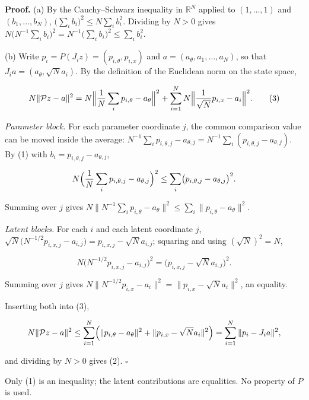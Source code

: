 \documentclass[11pt,a4paper]{report}
\begin{document}
\textbf{Proof.} (a) By the Cauchy–Schwarz inequality in \(\mathbb R^N\) applied to \((1,\dots,1)\) and \((b_1,\dots,b_N)\), \(\bigl(\sum_ib_i\bigr)^2\le N\sum_ib_i^2\). Dividing by \(N>0\) gives \(N\bigl(N^{-1}\sum_ib_i\bigr)^2=N^{-1}\bigl(\sum_ib_i\bigr)^2\le\sum_ib_i^2\).




(b) Write \(p_i=P(J_iz)=(p_{i,\theta},p_{i,x})\) and \(a=(a_\theta,a_1,\dots,a_N)\), so that \(J_ia=(a_\theta,\sqrt Na_i)\). By the definition of the Euclidean norm on the state space,


\[N\|\mathcal Pz-a\|^2=N\Bigl\|\frac1N\sum_ip_{i,\theta}-a_\theta\Bigr\|^2+\sum_{i=1}^NN\Bigl\|\frac{1}{\sqrt N}p_{i,x}-a_i\Bigr\|^2.\qquad(3)\]


\emph{Parameter block.} For each parameter coordinate \(j\), the common comparison value can be moved inside the average: \(N^{-1}\sum_ip_{i,\theta,j}-a_{\theta,j}=N^{-1}\sum_i(p_{i,\theta,j}-a_{\theta,j})\). By (1) with \(b_i=p_{i,\theta,j}-a_{\theta,j}\),


\[N\Bigl(\frac1N\sum_ip_{i,\theta,j}-a_{\theta,j}\Bigr)^2\le\sum_i\bigl(p_{i,\theta,j}-a_{\theta,j}\bigr)^2 .\]


Summing over \(j\) gives \(N\|N^{-1}\sum_ip_{i,\theta}-a_\theta\|^2\le\sum_i\|p_{i,\theta}-a_\theta\|^2\).




\emph{Latent blocks.} For each \(i\) and each latent coordinate \(j\), \(\sqrt N\bigl(N^{-1/2}p_{i,x,j}-a_{i,j}\bigr)=p_{i,x,j}-\sqrt Na_{i,j}\); squaring and using \((\sqrt N)^2=N\),


\[N\bigl(N^{-1/2}p_{i,x,j}-a_{i,j}\bigr)^2=\bigl(p_{i,x,j}-\sqrt Na_{i,j}\bigr)^2 .\]


Summing over \(j\) gives \(N\|N^{-1/2}p_{i,x}-a_i\|^2=\|p_{i,x}-\sqrt Na_i\|^2\), an equality.




Inserting both into (3),


\[N\|\mathcal Pz-a\|^2\le\sum_{i=1}^N\Bigl(\|p_{i,\theta}-a_\theta\|^2+\|p_{i,x}-\sqrt Na_i\|^2\Bigr)=\sum_{i=1}^N\|p_i-J_ia\|^2,\]


and dividing by \(N>0\) gives (2). \(\square\)




Only (1) is an inequality; the latent contributions are equalities. No property of \(P\) is used.
\end{document}
